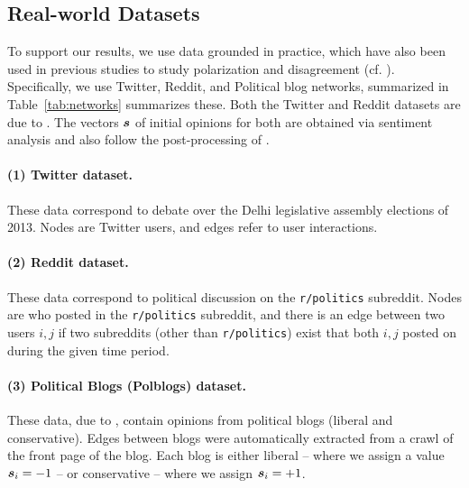 

\subsection{Real-world Datasets}
To support our results, we use data grounded in practice, which have also been used in previous studies to study polarization and disagreement (cf. \citet{Musco2018,Chitra2020,wang2024relationship,adamic2005political}). Specifically, we use Twitter, Reddit, and Political blog networks, summarized in Table~\ref{tab:networks} summarizes these. Both the Twitter and Reddit datasets are due to \citet{Chitra2020}. The vectors $\bm{s}$ of initial opinions for both are obtained via sentiment analysis and also follow the post-processing of \citet{wang2024relationship}.

\paragraph{(1) Twitter dataset.} These data correspond to debate over the Delhi legislative assembly elections of 2013. Nodes are Twitter users, and edges refer to user interactions. 

\paragraph{(2) Reddit dataset.} These data correspond to political discussion on the \texttt{r/politics} subreddit. Nodes are who posted in the \texttt{r/politics} subreddit, and there is an edge between two users $i,j$ if two subreddits (other than \texttt{r/politics}) exist that both $i,j$ posted on during the given time period. 

\paragraph{(3) Political Blogs (Polblogs) dataset.} These data, due to \citet{adamic2005political}, contain opinions from political blogs (liberal and conservative). Edges between blogs were automatically extracted from a crawl of the front page of the blog. Each blog is either liberal -- where we assign a value $\bm{s}_i = -1$ -- or conservative -- where we assign $\bm{s}_i = +1$.

